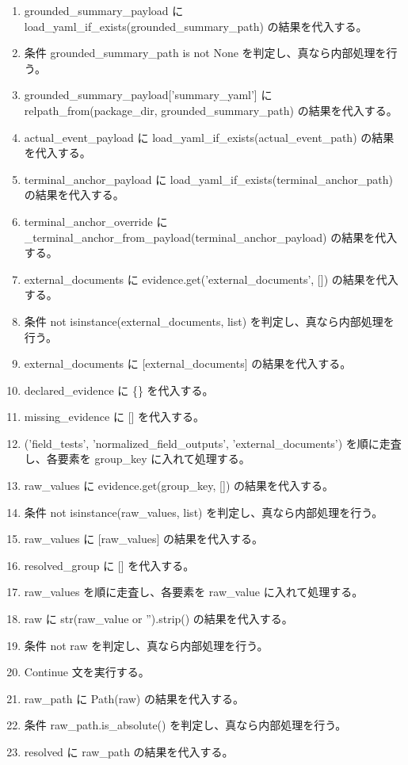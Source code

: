 \documentclass[a4paper,11pt]{article}
\begin{document}
\begin{enumerate}[leftmargin=1.8em]
\item grounded\_summary\_payload に load\_yaml\_if\_exists(grounded\_summary\_path) の結果を代入する。
\item 条件 grounded\_summary\_path is not None を判定し、真なら内部処理を行う。
\item   grounded\_summary\_payload['summary\_yaml'] に relpath\_from(package\_dir, grounded\_summary\_path) の結果を代入する。
\item actual\_event\_payload に load\_yaml\_if\_exists(actual\_event\_path) の結果を代入する。
\item terminal\_anchor\_payload に load\_yaml\_if\_exists(terminal\_anchor\_path) の結果を代入する。
\item terminal\_anchor\_override に \_terminal\_anchor\_from\_payload(terminal\_anchor\_payload) の結果を代入する。
\item external\_documents に evidence.get('external\_documents', []) の結果を代入する。
\item 条件 not isinstance(external\_documents, list) を判定し、真なら内部処理を行う。
\item   external\_documents に [external\_documents] の結果を代入する。
\item declared\_evidence に \{\} を代入する。
\item missing\_evidence に [] を代入する。
\item ('field\_tests', 'normalized\_field\_outputs', 'external\_documents') を順に走査し、各要素を group\_key に入れて処理する。
\item   raw\_values に evidence.get(group\_key, []) の結果を代入する。
\item   条件 not isinstance(raw\_values, list) を判定し、真なら内部処理を行う。
\item     raw\_values に [raw\_values] の結果を代入する。
\item   resolved\_group に [] を代入する。
\item   raw\_values を順に走査し、各要素を raw\_value に入れて処理する。
\item     raw に str(raw\_value or '').strip() の結果を代入する。
\item     条件 not raw を判定し、真なら内部処理を行う。
\item       Continue 文を実行する。
\item     raw\_path に Path(raw) の結果を代入する。
\item     条件 raw\_path.is\_absolute() を判定し、真なら内部処理を行う。
\item       resolved に raw\_path の結果を代入する。

\end{enumerate}
\end{document}
